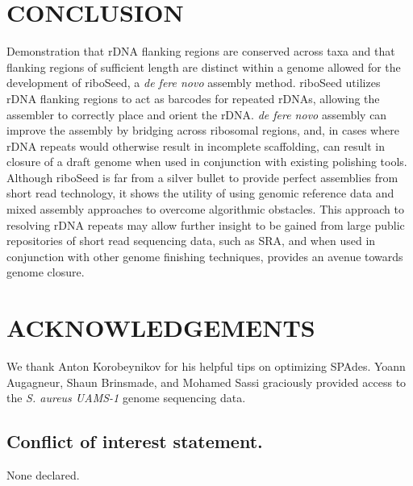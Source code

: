 \documentclass[a4,center,fleqn]{NAR}
\begin{document}
\section*{CONCLUSION}
Demonstration that rDNA flanking regions are conserved across taxa and that flanking regions of sufficient length are distinct within a genome allowed for the development of riboSeed, a \textit{de fere novo} assembly method. riboSeed  utilizes rDNA flanking regions to act as barcodes for repeated rDNAs, allowing the assembler to correctly place and orient the rDNA. \textit{de fere novo} assembly can improve the assembly by bridging across ribosomal regions, and, in cases where rDNA repeats would otherwise result in incomplete scaffolding, can result in closure of a draft genome when used in conjunction with existing polishing tools. Although riboSeed is far from a silver bullet to provide perfect assemblies from short read technology, it shows the utility of using genomic reference data and mixed assembly approaches to overcome algorithmic obstacles. This approach to resolving rDNA repeats may allow further insight to be gained from large public repositories of short read sequencing data, such as SRA, and when used in conjunction with other genome finishing techniques, provides an avenue towards genome closure.



\section{ACKNOWLEDGEMENTS}
We thank Anton Korobeynikov for his helpful tips on optimizing SPAdes. Yoann Augagneur, Shaun Brinsmade, and Mohamed Sassi graciously provided access to the \textit{S. aureus UAMS-1} genome sequencing data.


\subsection{Conflict of interest statement.}
None declared.



\end{document}
